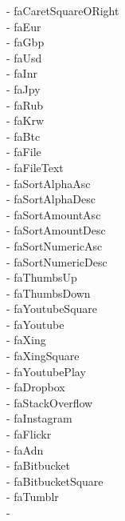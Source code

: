 \documentclass[%
               doublesided,
               paper=a4,
               fontsize=10pt
              ]{my-resume}
\begin{document}
\faCaretSquareORight - faCaretSquareORight\\ \faEur - faEur\\ \faGbp - faGbp\\ \faUsd - faUsd\\ \faInr - faInr\\ \faJpy - faJpy\\ \faRub - faRub\\ \faKrw - faKrw\\ \faBtc - faBtc\\ \faFile - faFile\\ \faFileText - faFileText\\ \faSortAlphaAsc - faSortAlphaAsc\\ \faSortAlphaDesc - faSortAlphaDesc\\ \faSortAmountAsc - faSortAmountAsc\\ \faSortAmountDesc - faSortAmountDesc\\ \faSortNumericAsc - faSortNumericAsc\\ \faSortNumericDesc - faSortNumericDesc\\ \faThumbsUp - faThumbsUp\\ \faThumbsDown - faThumbsDown\\ \faYoutubeSquare - faYoutubeSquare\\ \faYoutube - faYoutube\\ \faXing - faXing\\ \faXingSquare - faXingSquare\\ \faYoutubePlay - faYoutubePlay\\ \faDropbox - faDropbox\\ \faStackOverflow - faStackOverflow\\ \faInstagram - faInstagram\\ \faFlickr - faFlickr\\ \faAdn - faAdn\\ \faBitbucket - faBitbucket\\ \faBitbucketSquare - faBitbucketSquare\\ \faTumblr - faTumblr\\ \faTumblrSquare - 
\end{document}
